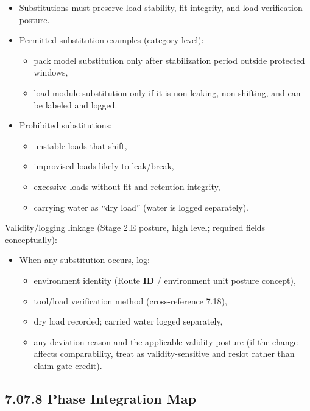 \documentclass[10pt]{article}
\begin{document}
\begin{itemize}
\item Substitutions must preserve load stability, fit integrity, and load verification posture.
\item Permitted substitution examples (category-level):
  \begin{itemize}
  \item pack model substitution only after stabilization period outside protected windows,
  \item load module substitution only if it is non-leaking, non-shifting, and can be labeled and logged.
  \end{itemize}
\item Prohibited substitutions:
  \begin{itemize}
  \item unstable loads that shift,
  \item improvised loads likely to leak/break,
  \item excessive loads without fit and retention integrity,
  \item carrying water as “dry load” (water is logged separately).
  \end{itemize}
\end{itemize}

Validity/logging linkage (Stage 2.E posture, high level; required fields conceptually):

\begin{itemize}
\item When any substitution occurs, log:
  \begin{itemize}
  \item environment identity (Route \textbf{ID} / environment unit posture concept),
  \item tool/load verification method (cross-reference 7.18),
  \item dry load recorded; carried water logged separately,
  \item any deviation reason and the applicable validity posture (if the change affects comparability, treat as validity-sensitive and reslot rather than claim gate credit).
  \end{itemize}
\end{itemize}

\subsection*{7.07.8 Phase Integration Map}
{}
\end{document}
